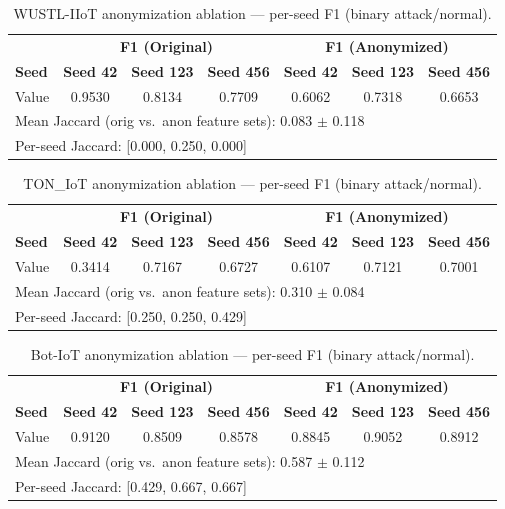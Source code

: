 \begin{table}[htbp]
\centering
\caption{WUSTL-IIoT anonymization ablation --- per-seed F1
  (binary attack/normal).}
\label{tab:anon_perseed_wustl}
\begin{tabular}{lccc|ccc}
\toprule
 & \multicolumn{3}{c|}{\textbf{F1 (Original)}} & \multicolumn{3}{c}{\textbf{F1 (Anonymized)}} \\
\textbf{Seed} & \textbf{Seed 42} & \textbf{Seed 123} & \textbf{Seed 456} &
               \textbf{Seed 42} & \textbf{Seed 123} & \textbf{Seed 456} \\
\midrule
Value & 0.9530 & 0.8134 & 0.7709 & 0.6062 & 0.7318 & 0.6653 \\
\midrule
\multicolumn{7}{l}{Mean Jaccard (orig vs.\ anon feature sets): 0.083 $\pm$ 0.118}\\
\multicolumn{7}{l}{Per-seed Jaccard: [0.000, 0.250, 0.000]}\\
\bottomrule
\end{tabular}
\end{table}

\begin{table}[htbp]
\centering
\caption{TON\_IoT anonymization ablation --- per-seed F1 (binary attack/normal).}
\label{tab:anon_perseed_toniot}
\begin{tabular}{lccc|ccc}
\toprule
 & \multicolumn{3}{c|}{\textbf{F1 (Original)}} & \multicolumn{3}{c}{\textbf{F1 (Anonymized)}} \\
\textbf{Seed} & \textbf{Seed 42} & \textbf{Seed 123} & \textbf{Seed 456} &
               \textbf{Seed 42} & \textbf{Seed 123} & \textbf{Seed 456} \\
\midrule
Value & 0.3414 & 0.7167 & 0.6727 & 0.6107 & 0.7121 & 0.7001 \\
\midrule
\multicolumn{7}{l}{Mean Jaccard (orig vs.\ anon feature sets): 0.310 $\pm$ 0.084}\\
\multicolumn{7}{l}{Per-seed Jaccard: [0.250, 0.250, 0.429]}\\
\bottomrule
\end{tabular}
\end{table}

\begin{table}[htbp]
\centering
\caption{Bot-IoT anonymization ablation --- per-seed F1 (binary attack/normal).}
\label{tab:anon_perseed_botiot}
\begin{tabular}{lccc|ccc}
\toprule
 & \multicolumn{3}{c|}{\textbf{F1 (Original)}} & \multicolumn{3}{c}{\textbf{F1 (Anonymized)}} \\
\textbf{Seed} & \textbf{Seed 42} & \textbf{Seed 123} & \textbf{Seed 456} &
               \textbf{Seed 42} & \textbf{Seed 123} & \textbf{Seed 456} \\
\midrule
Value & 0.9120 & 0.8509 & 0.8578 & 0.8845 & 0.9052 & 0.8912 \\
\midrule
\multicolumn{7}{l}{Mean Jaccard (orig vs.\ anon feature sets): 0.587 $\pm$ 0.112}\\
\multicolumn{7}{l}{Per-seed Jaccard: [0.429, 0.667, 0.667]}\\
\bottomrule
\end{tabular}
\end{table}

